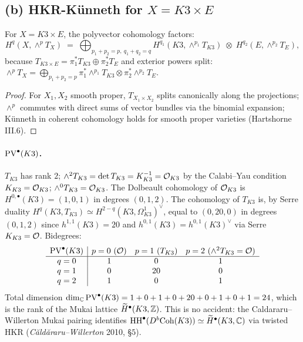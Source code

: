 \subsection*{(b) HKR-K\"unneth for $X = K3\times E$}

\begin{proposition}
\label{prop:pv-kunneth-k3xe}
For $X = K3\times E$, the polyvector cohomology factors:
\[
 H^q(X, \wedge^p T_X)
 \;=\;
 \bigoplus_{p_1+p_2 = p,\ q_1+q_2 = q}
 H^{q_1}(K3, \wedge^{p_1} T_{K3})
 \;\otimes\;
 H^{q_2}(E, \wedge^{p_2} T_E),
\]
because $T_{K3\times E} = \pi_1^* T_{K3} \oplus \pi_2^* T_E$ and
exterior powers split:
$\wedge^p T_X = \bigoplus_{p_1+p_2=p}
 \pi_1^*\wedge^{p_1}T_{K3}\otimes\pi_2^*\wedge^{p_2}T_E$.
\end{proposition}

\begin{proof}
For $X_1, X_2$ smooth proper, $T_{X_1\times X_2}$ splits canonically
along the projections; $\wedge^p$ commutes with direct sums of vector
bundles via the binomial expansion; K\"unneth in coherent cohomology
holds for smooth proper varieties (Hartshorne III.6).
\end{proof}

\paragraph{$\mathrm{PV}^\bullet(K3)$.}
$T_{K3}$ has rank $2$; $\wedge^2 T_{K3} = \det T_{K3} = K_{K3}^{-1} = \mathcal{O}_{K3}$
by the Calabi--Yau condition $K_{K3} = \mathcal{O}_{K3}$; $\wedge^0 T_{K3} = \mathcal{O}_{K3}$.
The Dolbeault cohomology of $\mathcal{O}_{K3}$ is $H^{0,\bullet}(K3) = (1, 0, 1)$
in degrees $(0, 1, 2)$. The cohomology of $T_{K3}$ is, by Serre duality
$H^q(K3, T_{K3}) \simeq H^{2-q}(K3, \Omega^1_{K3})^\vee$, equal to
$(0, 20, 0)$ in degrees $(0,1,2)$ since $h^{1,1}(K3) = 20$ and
$h^{0,1}(K3) = h^{0,1}(K3)^\vee$ via Serre $K_{K3} = \mathcal{O}$. Bidegrees:
\[
\begin{array}{c|ccc}
 \PV^\bullet(K3) & p=0\ (\cO) & p=1\ (T_{K3}) & p=2\ (\wedge^2 T_{K3}=\cO) \\\hline
 q=0 & 1 & 0 & 1 \\
 q=1 & 0 & 20 & 0 \\
 q=2 & 1 & 0 & 1
\end{array}
\]
Total dimension $\dim_{\mathbb{C}} \mathrm{PV}^\bullet(K3) = 1+0+1+0+20+0+1+0+1 = 24$,
which is the rank of the Mukai lattice $\widetilde H^\bullet(K3,\mathbb{Z})$.
This is no accident: the Caldararu--Willerton Mukai pairing identifies
$\mathrm{HH}^\bullet(D^b\mathrm{Coh}(K3)) \simeq \widetilde H^\bullet(K3,\mathbb{C})$ via
twisted HKR (\emph{C\u ald\u araru--Willerton} 2010, \S$5$).

